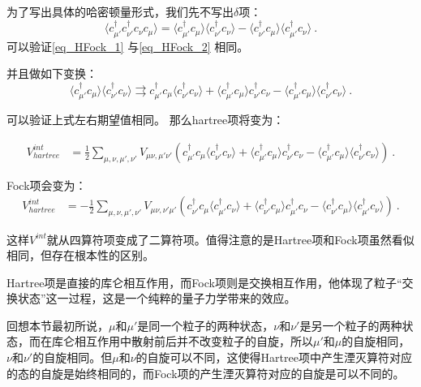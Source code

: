 为了写出具体的哈密顿量形式，我们先不写出$\delta$项：
\begin{equation}\label{eq_HFock_2}
\langle c_{\mu'}^\dagger c_{\nu'}^\dagger c_{\nu}^~ c_{\mu}^~ \rangle = \langle c_{\mu'}^\dagger c_\mu^~\rangle\langle c_{\nu'}^\dagger c_\nu^~\rangle-\langle c_{\nu'}^\dagger c_\mu^~\rangle\langle c_{\mu'}^\dagger c_\nu^~\rangle~.
\end{equation}
可以验证\autoref{eq_HFock_1} 与\autoref{eq_HFock_2} 相同。

并且做如下变换：
$$\langle c_{\mu'}^\dagger c_\mu^~\rangle\langle c_{\nu'}^\dagger c_\nu^~\rangle\rightrightarrows c_{\mu'}^\dagger c_\mu^~\langle c_{\nu'}^\dagger c_\nu^~\rangle+\langle c_{\mu'}^\dagger c_\mu^~\rangle c_{\nu'}^\dagger c_\nu^~-\langle c_{\mu'}^\dagger c_\mu^~\rangle\langle c_{\nu'}^\dagger c_\nu^~\rangle ~.$$

可以验证上式左右期望值相同。
那么hartree项将变为：

\begin{equation}
\begin{aligned}
V^{int}_{hartree}&=\frac{1}{2}\sum\limits_{\mu,\nu,\mu',\nu'}V_{\mu\nu,\mu'\nu'}\left(c_{\mu'}^\dagger c_\mu^~\langle c_{\nu'}^\dagger c_\nu^~\rangle+\langle c_{\mu'}^\dagger c_\mu^~\rangle c_{\nu'}^\dagger c_\nu^~-\langle c_{\mu'}^\dagger c_\mu^~\rangle\langle c_{\nu'}^\dagger c_\nu^~\rangle\right)~.
\end{aligned}
\end{equation}

Fock项会变为：
\begin{equation}
\begin{aligned}
V^{int}_{hartree}&=-\frac{1}{2}\sum\limits_{\mu,\nu,\mu',\nu'}V_{\mu\nu,\nu'\mu'}\left(c_{\nu'}^\dagger c_\mu^~\langle c_{\mu'}^\dagger c_\nu^~\rangle+\langle c_{\nu'}^\dagger c_\mu^~\rangle c_{\mu'}^\dagger c_\nu^~-\langle c_{\nu'}^\dagger c_\mu^~\rangle\langle c_{\mu'}^\dagger c_\nu^~\rangle\right)~.
\end{aligned}
\end{equation}

这样$V^{int}$就从四算符项变成了二算符项。值得注意的是Hartree项和Fock项虽然看似相同，但存在根本性的区别。

Hartree项是直接的库仑相互作用，而Fock项则是交换相互作用，他体现了粒子“交换状态”这一过程，这是一个纯粹的量子力学带来的效应。

回想本节最初所说，$\mu$和$\mu'$是同一个粒子的两种状态，$\nu$和$\nu'$是另一个粒子的两种状态，而在库仑相互作用中散射前后并不改变粒子的自旋，所以$\mu'$和$\mu$的自旋相同，$\nu$和$\nu'$的自旋相同。但$\mu$和$\nu$的自旋可以不同，这使得Hartree项中产生湮灭算符对应的态的自旋是始终相同的，而Fock项的产生湮灭算符对应的自旋是可以不同的。
